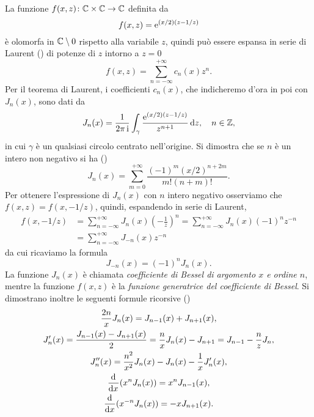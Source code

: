 La funzione $f(x,z)\colon\mathbb{C}\times\mathbb{C}\to\mathbb{C}$ definita da
\begin{equation}
  f(x,z) = \operatorname{\mathrm{e}}^{(x/2)(z - 1/z)}
\end{equation}
è olomorfa in $\mathbb{C}\setminus 0$ rispetto alla variabile $z$, quindi può essere
espansa in serie di Laurent (\textcite{demarco:analisi2}) di potenze di $z$
intorno a $z=0$
\begin{equation}
  f(x,z) = \sum_{n = -\infty}^{+\infty} c_n(x) z^n.
\end{equation}
Per il teorema di Laurent, i coefficienti $c_n(x)$, che indicheremo d'ora in poi
con $J_n(x)$, sono dati da
\begin{equation}
  J_n(x) = \frac{1}{2\pi\operatorname{\mathrm{i}}}\int_\gamma \frac{\operatorname{\mathrm{e}}^{(x/2)(z-1/z)}}{z^{n+1}}\mathop{}\!\mathrm{d} z,
  \quad n\in\mathbb{Z},
\end{equation}
in cui $\gamma$ è un qualsiasi circolo centrato nell'origine. Si dimostra che se
$n$ è un intero non negativo si ha (\textcite{whittaker:modern-analysis})
\begin{equation}
  J_n (x) = \sum_{m = 0}^{+\infty}\frac{(-1)^m(x/2)^{n+2m}}{m!(n+m)!}.
\end{equation}
Per ottenere l'espressione di $J_n(x)$ con $n$ intero negativo osserviamo che
$f(x,z) = f(x,-1/z)$, quindi, espandendo in serie di Laurent,
\begin{equation}
  \begin{split}
    f(x,-1/z) &= \sum_{n = -\infty}^{+\infty}J_n(x)
    \left(
      -\frac{1}{z}
    \right)^n = \sum_{n = -\infty}^{+\infty}J_n(x)(-1)^nz^{-n} \\
    &= \sum_{n = -\infty}^{+\infty}J_{-n}(x)z^{-n}
  \end{split}
\end{equation}
da cui ricaviamo la formula
\begin{equation}
  J_{-n}(x) = (-1)^nJ_n(x).
\end{equation}
La funzione $J_n(x)$ è chiamata \emph{coefficiente di Bessel di argomento $x$ e
  ordine $n$}, mentre la funzione $f(x,z)$ è la \emph{funzione generatrice del
  coefficiente di Bessel}. Si dimostrano inoltre le seguenti formule ricorsive
(\textcites{watson:bessel}{whittaker:modern-analysis})
\begin{subequations}
  \begin{gather}
    \frac{2n}{x} J_n(x) = J_{n-1}(x) + J_{n+1}(x),\\
    J_n'(x) = \frac{J_{n-1}(x) - J_{n+1}(x)}{2} = \frac{n}{x}J_n(x) - J_{n+1} =
    J_{n-1} - \frac{n}{z}J_n,\\
    J_n''(x) = \frac{n^2}{x^2}J_n(x) - J_n(x) - \frac{1}{x}J_n'(x),\\
    \frac{{\mathop{}\!\mathrm{d}^{}}}{\mathop{}\!\mathrm{d} {x}^{}}(x^nJ_n(x)) = x^nJ_{n-1}(x),\\
    \frac{{\mathop{}\!\mathrm{d}^{}}}{\mathop{}\!\mathrm{d} {x}^{}}(x^{-n}J_n(x)) = -xJ_{n+1}(x).
  \end{gather}
\end{subequations}
